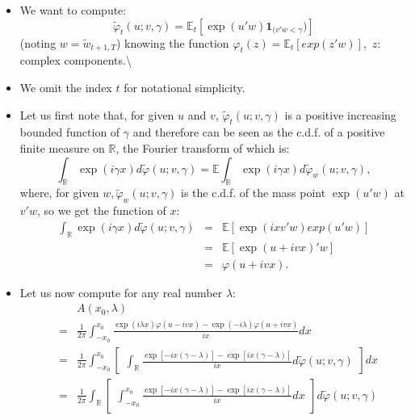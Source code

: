 \documentclass[
  12pt,
]{book}
\providecommand{\tightlist}{%
  \setlength{\itemsep}{0pt}\setlength{\parskip}{0pt}}
\theoremstyle{definition}
\theoremstyle{definition}
\theoremstyle{definition}
\theoremstyle{definition}
\theoremstyle{remark}
\begin{document}
\begin{itemize}
\tightlist
\item
  We want to compute:
  \[
  \tilde{\varphi}_t(u;v,\gamma) = \mathbb{E}_t[\exp(u'w)\textbf{1}_{(v'w<\gamma})]
  \]
  (noting \(w=\tilde{w}_{t+1,T}\)) knowing the function \(\varphi_t(z)=\mathbb{E}_t[exp(z'w)],\) \(z\): complex components.\textbackslash{}
\item
  We omit the index \(t\) for notational simplicity.
\item
  Let us first note that, for given \(u\) and \(v\), \(\tilde{\varphi}_t(u;v,\gamma)\) is a positive increasing bounded function of \(\gamma\) and therefore can be seen as the c.d.f. of a positive finite measure on \(\mathbb{R}\), the Fourier transform of which is:
  \[
  \int_{\mathbb{R}} \exp(i\gamma x)d\tilde{\varphi}(u;v,\gamma) = \mathbb{E} \int_{\mathbb{R}} \exp(i\gamma x)d\tilde{\varphi}_w(u;v,\gamma),
  \]
  where, for given \(w, \tilde{\varphi}_w(u;v,\gamma)\) is the c.d.f. of the mass point \(\exp(u'w)\) at \(v'w\), so we get
  the function of \(x\):
  \begin{eqnarray*}
  \displaystyle \int_{\mathbb{R}} \exp(i\gamma x) d\tilde{\varphi}(u;v,\gamma) &=& \mathbb{E}[\exp(ixv'w)exp(u'w)] \\
  & =& \mathbb{E}[\exp(u+ivx)'w] \\
  & =& \varphi(u+ivx).
  \end{eqnarray*}
\item
  Let us now compute for any real number \(\lambda\):
  \begin{eqnarray*}
  &&A(x_0,\lambda) \\
  &=& \displaystyle \frac{1}{2\pi} \int^{x_0}_{-x_0}
  \displaystyle \frac{\exp(i\lambda x)\varphi(u-ivx)-\exp(-i\lambda)\varphi(u+ivx)}{ix}dx \\
  &=& \displaystyle \frac{1}{2\pi} \int^{x_0}_{-x_0}\left[ \begin{array}{l} \displaystyle \int_{\mathbb{R}}
  \displaystyle \frac{\exp[-ix(\gamma-\lambda)]-\exp[ix(\gamma-\lambda)]}{ix}d\tilde{\varphi}(u;v,\gamma)
  \end{array} \right]dx \\
  &=& \displaystyle \frac{1}{2\pi} \displaystyle \int_{\mathbb{R}}
  \left[ \begin{array}{l}  \displaystyle \int^{x_0}_{-x_0}  \displaystyle \frac{\exp[-ix(\gamma-\lambda)]
  -\exp[ix(\gamma-\lambda)]}{ix}dx \end{array} \right]d\tilde{\varphi}(u;v,\gamma)
  \end{eqnarray*}

\end{itemize}
\end{document}

